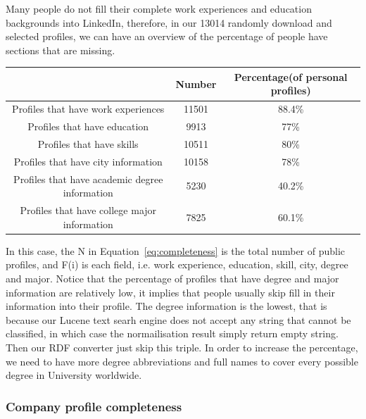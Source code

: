 Many people do not fill their complete work experiences and education backgrounds into LinkedIn, therefore, in our 13014 randomly download and selected profiles, we can have an overview of the percentage of people have sections that are missing.

\begin{table}[H]
    \begin{tabular}{|c|c|c|}
    \hline
    ~                                                             & Number & Percentage(of personal profiles) \\ \hline
    Profiles that have work experiences                           & 11501  & 88.4\%                             \\ \hline
    Profiles that have education                                  & 9913   & 77\%                               \\ \hline
    Profiles that have skills                                     & 10511  & 80\%                               \\ \hline
    Profiles that have city information & 10158  & 78\%                               \\ \hline
    Profiles that have academic degree information                & 5230   & 40.2\%                             \\ \hline
    Profiles that have college major information                  & 7825   & 60.1\%                             \\ \hline
    \end{tabular}
\end{table}

In this case, the N in Equation~\ref{eq:completeness} is the total number of public profiles, and F(i) is each field, i.e. work experience, education, skill, city, degree and major.
Notice that the percentage of profiles that have degree and major information are relatively low, it implies that people usually skip fill in their information into their profile. The degree information is the lowest, that is because our Lucene text searh engine does not accept any string that cannot be classified, in which case the normailisation result simply return empty string. Then our RDF converter just skip this triple. In order to increase the percentage, we need to have more degree abbreviations and full names to cover every possible degree in University worldwide.

\subsubsection{Company profile completeness}

